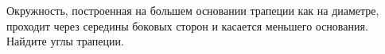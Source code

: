 \begin{ex}
	\begin{condition}
		Окружность, построенная на большем основании трапеции как на диаметре, проходит через середины боковых сторон и касается меньшего основания. Найдите углы трапеции.
	\end{condition}
	\answer{\( 75\degree, 75\degree, 105\degree, 105\degree\)}
\end{ex}